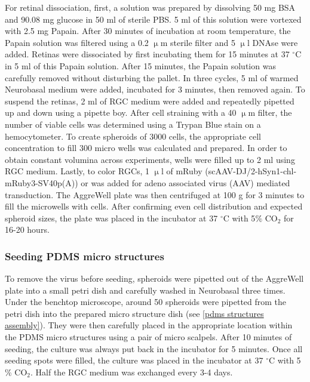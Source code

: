 For retinal dissociation, first, a solution was prepared by dissolving 50 mg BSA
and 90.08 mg glucose in 50 ml of sterile PBS. 5 ml of this solution were
vortexed with 2.5 mg Papain. After 30 minutes of incubation at room temperature,
the Papain solution was filtered using a 0.2 $\upmu$m sterile filter and 5
$\upmu$l DNAse were added. Retinas were dissociated by first incubating them for
15 minutes at 37 $^{\circ}$C in 5 ml of this Papain solution. After 15 minutes,
the Papain solution was carefully removed without disturbing the pallet. In
three cycles, 5 ml of warmed Neurobasal medium were added, incubated for 3
minutes, then removed again. To suspend the retinas, 2 ml of RGC medium were
added and repeatedly pipetted up and down using a pipette boy. After cell
straining with a 40 $\upmu$m filter, the number of viable cells was determined
using a Trypan Blue stain on a hemocytometer. To create spheroids of 3000 cells,
the appropriate cell concentration to fill 300 micro wells was calculated and
prepared. In order to obtain constant volumina across experiments, wells were
filled up to 2 ml using RGC medium. Lastly, to color RGCs, 1 $\upmu$l of mRuby
(scAAV-DJ/2-hSyn1-chl-mRuby3-SV40p(A)) or 
was added for adeno associated virus (AAV) mediated transduction. The
AggreWell\textsuperscript{\texttrademark} plate was then centrifuged at 100 g
for 3 minutes to fill the microwells with cells. After confirming even cell
distribution and expected spheroid sizes, the plate was placed in the incubator
at 37 $^{\circ}$C with 5$\%$ CO$_{2}$ for 16-20 hours. 

\subsubsection{Seeding PDMS micro structures}
To remove the virus before seeding, spheroids were pipetted out of the
AggreWell\textsuperscript{\texttrademark} plate into a small petri dish and
carefully washed in Neurobasal three times. Under the benchtop microscope,
around 50 spheroids were pipetted from the petri dish into the prepared micro
structure dish (see \ref{pdms structures assembly}). They were then carefully
placed in the appropriate location within the PDMS micro structures using a pair
of micro scalpels. After 10 minutes of seeding, the culture was always put back
in the incubator for 5 minutes. Once all seeding spots were filled, the culture
was placed in the incubator at 37 $^{\circ}$C with 5  \% CO$_{2}$. Half the RGC
medium was exchanged every 3-4 days.

